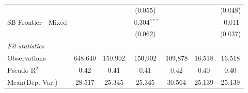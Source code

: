 \begin{tabular}{lcccccc}
                        &               &              & (0.055)        &               &              & (0.048)\\   
   SB Frontier - Mixed  &               &              & -0.304$^{***}$ &               &              & -0.011\\   
                        &               &              & (0.062)        &               &              & (0.037)\\   
   \midrule
   \emph{Fit statistics}\\
   Observations         & 648,640       & 150,902      & 150,902        & 109,878       & 16,518       & 16,518\\  
   Pseudo R$^2$         & 0.42          & 0.41         & 0.41           & 0.42          & 0.40         & 0.40\\  
Mean(Dep. Var.) & 28.517 & 25.345 & 25.345 & 30.564 & 25.139 & 25.139 \\
   

\end{tabular}
